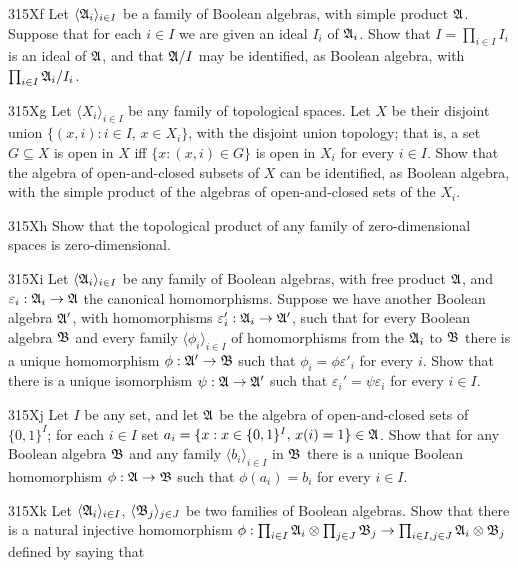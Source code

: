 {\spheader 315Xf Let $\langle\frak A_i\rangle_{i\in I}$ be a
family of Boolean algebras, with simple product $\frak A$.   Suppose
that for each $i\in I$ we are given an ideal $I_i$ of $\frak A_i$.
Show that $I=\prod_{i\in I}I_i$ is an ideal of $\frak A$, and that
$\frak A/I$ may be identified, as Boolean algebra, with
$\prod_{i\in I}\frak A_i/I_i$.

\spheader 315Xg Let $\langle X_i\rangle_{i\in I}$ be any family
of topological spaces.   Let $X$ be their disjoint union
$\{(x,i):i\in I,\,x\in X_i\}$, with the disjoint union topology;  that
is, a set
$G\subseteq X$ is open in $X$ iff $\{x:(x,i)\in G\}$ is open in $X_i$
for every $i\in I$.   Show that the algebra of open-and-closed
subsets of $X$ can be identified, as Boolean algebra, with the simple
product of the algebras of open-and-closed sets of the $X_i$.

\spheader 315Xh Show that the topological product of any family of
zero-dimensional spaces is zero-dimensional.

\spheader 315Xi Let $\langle\frak A_i\rangle_{i\in I}$ be any
family of Boolean algebras, with free product $\frak A$, and
$\varepsilon_i:\frak A_i\to\frak A$ the canonical homomorphisms.
Suppose we have another Boolean algebra $\frak A'$, with homomorphisms
$\varepsilon'_i:\frak A_i\to\frak A'$, such that for every Boolean
algebra $\frak B$ and every family $\langle\phi_i\rangle_{i\in I}$ of
homomorphisms from the $\frak A_i$ to $\frak B$ there is a unique
homomorphism $\phi:\frak A'\to\frak B$ such that
$\phi_i=\phi\varepsilon'_i$ for every $i$.   Show that there is a unique
isomorphism $\psi:\frak A\to\frak A'$ such that
$\varepsilon_i'=\psi\varepsilon_i$ for every $i\in I$.

\spheader 315Xj Let $I$ be any set, and let $\frak A$ be the
algebra of open-and-closed sets of $\{0,1\}^I$;  for each $i\in I$ set
$a_i=\{x:x\in\{0,1\}^I,\,x(i)=1\}\in\frak A$.   Show that for any
Boolean algebra $\frak B$ and any family $\langle b_i\rangle_{i\in I}$ in
$\frak B$ there is a unique Boolean homomorphism
$\phi:\frak A\to\frak B$ such that $\phi(a_i)=b_i$ for every $i\in I$.

\spheader 315Xk Let $\langle\frak A_i\rangle_{i\in I}$,
$\langle\frak B_j\rangle_{j\in J}$ be two families of Boolean algebras.
Show that there is a natural injective homomorphism
$\phi:\prod_{i\in I}\frak A_i\otimes\prod_{j\in J}\frak B_j
\to\prod_{i\in I,j\in J}\frak A_i\otimes\frak B_j$ defined by saying
that


}
